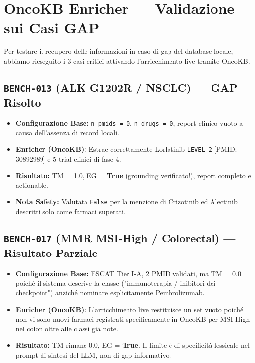 \documentclass[12pt, a4paper]{article}
\newcommand{\pass}[1]{{\color{passgreen}\textbf{#1}}}
\newcommand{\bench}[1]{{\texttt{\textbf{#1}}}}
\begin{document}
\section{OncoKB Enricher --- Validazione sui Casi GAP}
Per testare il recupero delle informazioni in caso di gap del database locale, abbiamo rieseguito i 3 casi critici attivando l'arricchimento live tramite OncoKB.

\subsection{\bench{BENCH-013} (ALK G1202R / NSCLC) --- GAP Risolto}
\begin{itemize}[leftmargin=1.6em, itemsep=2pt]
  \item \textbf{Configurazione Base:} \texttt{n\_pmids = 0}, \texttt{n\_drugs = 0}, report clinico vuoto a causa dell'assenza di record locali.
  \item \textbf{Enricher (OncoKB):} Estrae correttamente Lorlatinib \texttt{LEVEL\_2} [PMID: 30892989] e 5 trial clinici di fase 4.
  \item \textbf{Risultato:} TM = 1.0, EG = \pass{True} (grounding verificato!), report completo e actionable.
  \item \textbf{Nota Safety:} Valutata \texttt{False} per la menzione di Crizotinib ed Alectinib descritti solo come farmaci superati.
\end{itemize}

\subsection{\bench{BENCH-017} (MMR MSI-High / Colorectal) --- Risultato Parziale}
\begin{itemize}[leftmargin=1.6em, itemsep=2pt]
  \item \textbf{Configurazione Base:} ESCAT Tier I-A, 2 PMID validati, ma TM = 0.0 poiché il sistema descrive la classe ("immunoterapia / inibitori dei checkpoint") anziché nominare esplicitamente Pembrolizumab.
  \item \textbf{Enricher (OncoKB):} L'arricchimento live restituisce un set vuoto poiché non vi sono nuovi farmaci registrati specificamente in OncoKB per MSI-High nel colon oltre alle classi già note.
  \item \textbf{Risultato:} TM rimane 0.0, EG = \pass{True}. Il limite è di specificità lessicale nel prompt di sintesi del LLM, non di gap informativo.
\end{itemize}
\end{document}
